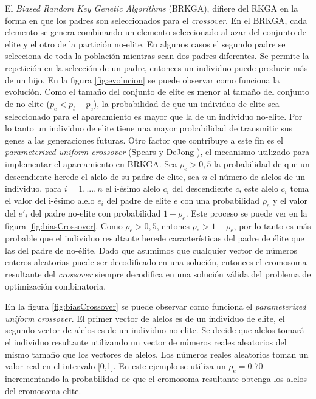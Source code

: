 El \textit{Biased Random Key Genetic Algorithms} (BRKGA), difiere del RKGA en la forma en que los padres son seleccionados para el \textit{crossover}. En el BRKGA, cada elemento se genera combinando un elemento seleccionado al azar del conjunto de elite y el otro de la partición no-elite. En algunos casos el segundo padre se selecciona de toda la población mientras sean dos padres diferentes. Se permite la repetición en la selección de un padre, entonces un individuo puede producir más de un hijo. En la figura \ref{fig:evolucion} se puede observar como funciona la evolución. Como el tamaño del conjunto de elite es menor al tamaño del conjunto de no-elite ($p_e < p_t - p_e$), la probabilidad de que un individuo de elite sea seleccionado para el apareamiento es mayor que la de un individuo no-elite. Por lo tanto un individuo de elite tiene una mayor probabilidad de transmitir sus genes a las generaciones futuras. Otro factor que contribuye a este fin es el \textit{parameterized uniform crossover} (Spears y DeJong \cite{SpearsDeJong}), el mecanismo utilizado para implementar el apareamiento en BRKGA. Sea $\rho_e > 0,5$ la probabilidad de que un descendiente herede el alelo de su padre de elite, sea $n$ el número de alelos de un individuo, para $i =1,...,n$ el i-ésimo alelo $c_i$ del descendiente $c$, este alelo $c_i$ toma el valor del i-ésimo alelo $e_i$ del padre de elite $e$ con una probabilidad $\rho_e$ y el valor del $e'_i$ del padre no-elite con probabilidad $1-\rho_e$. Este proceso se puede ver en la figura \ref{fig:biasCrossover}. Como $\rho_e > 0,5$, entones $\rho_e > 1 - \rho_e$, por lo tanto es más probable que el individuo resultante herede características del padre de élite que las del padre de no-élite. Dado que asumimos que cualquier vector de números enteros aleatorias puede ser decodificado en una solución, entonces el cromosoma resultante del \textit{crossover} siempre decodifica en una solución válida del problema de optimización combinatoria. 

\bigskip

En la figura \ref{fig:biasCrossover} se puede observar como funciona el \textit{parameterized uniform crossover}. El primer vector de alelos es de un individuo de elite, el segundo vector de alelos es de un individuo no-elite. Se decide que alelos tomará el individuo resultante utilizando un vector de números reales aleatorios del mismo tamaño que los vectores de alelos. Los números reales aleatorios toman un valor real en el intervalo [0,1]. En este ejemplo se utiliza un $\rho_e = 0.70$ incrementando la probabilidad de que el cromosoma resultante obtenga los alelos del cromosoma elite.

